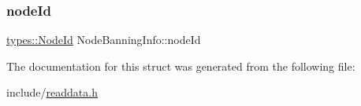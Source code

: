 \mbox{\label{struct_node_banning_info_a36fe6e08eec0da529dcd5ac9a863f831}} 
\subsubsection{\texorpdfstring{nodeId}{nodeId}}
{\footnotesize\ttfamily \mbox{\hyperlink{classtypes_1_1_node_id}{types\+::\+Node\+Id}} Node\+Banning\+Info\+::node\+Id}



The documentation for this struct was generated from the following file\+:\begin{DoxyCompactItemize}
\item 
include/\mbox{\hyperlink{readdata_8h}{readdata.\+h}}\end{DoxyCompactItemize}
